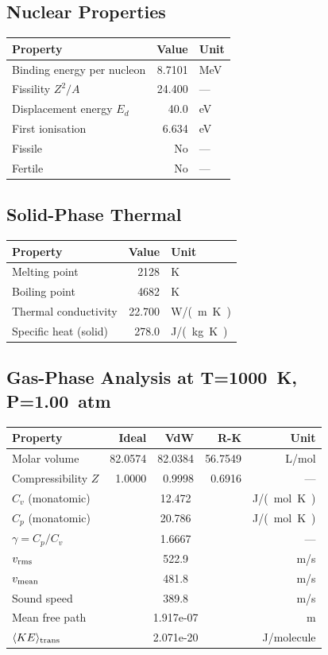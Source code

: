 \documentclass[11pt,a4paper]{article}
\begin{document}
\subsection{Nuclear Properties}
\begin{tabular}{lrl}
  \toprule
  Property & Value & Unit \\
  \midrule
  Binding energy per nucleon & 8.7101 & \si{MeV} \\
  Fissility $Z^2/A$ & 24.400 & --- \\
  Displacement energy $E_d$ & 40.0 & \si{eV} \\
  First ionisation & 6.634 & \si{eV} \\
  Fissile & No & --- \\
  Fertile & No & --- \\
  \bottomrule
\end{tabular}

\subsection{Solid-Phase Thermal}
\begin{tabular}{lrl}
  \toprule
  Property & Value & Unit \\
  \midrule
  Melting point & 2128 & \si{K} \\
  Boiling point & 4682 & \si{K} \\
  Thermal conductivity & 22.700 & \si{W/(m.K)} \\
  Specific heat (solid) & 278.0 & \si{J/(kg.K)} \\
  \bottomrule
\end{tabular}

\subsection{Gas-Phase Analysis at T=\SI{1000}{K}, P=\SI{1.00}{atm}}
\begin{tabular}{lrrrr}
  \toprule
  Property & Ideal & VdW & R-K & Unit \\
  \midrule
  Molar volume & 82.0574 & 82.0384 & 56.7549 & \si{L/mol} \\
  Compressibility $Z$ & 1.0000 & 0.9998 & 0.6916 & --- \\
  \midrule
  $C_v$ (monatomic) & \multicolumn{3}{c}{12.472} & \si{J/(mol.K)} \\
  $C_p$ (monatomic) & \multicolumn{3}{c}{20.786} & \si{J/(mol.K)} \\
  $\gamma = C_p/C_v$ & \multicolumn{3}{c}{1.6667} & --- \\
  $v_{\rm rms}$ & \multicolumn{3}{c}{522.9} & \si{m/s} \\
  $v_{\rm mean}$ & \multicolumn{3}{c}{481.8} & \si{m/s} \\
  Sound speed & \multicolumn{3}{c}{389.8} & \si{m/s} \\
  Mean free path & \multicolumn{3}{c}{1.917e-07} & \si{m} \\
  $\langle KE \rangle_{\rm trans}$ & \multicolumn{3}{c}{2.071e-20} & \si{J/molecule} \\
  \bottomrule
\end{tabular}
\end{document}
